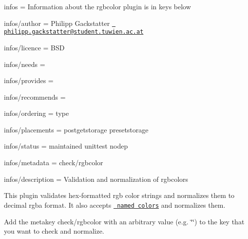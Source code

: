 
\begin{DoxyItemize}
\item infos = Information about the rgbcolor plugin is in keys below
\item infos/author = Philipp Gackstatter \href{mailto:philipp.gackstatter@student.tuwien.ac.at}{\texttt{ philipp.\+gackstatter@student.\+tuwien.\+ac.\+at}}
\item infos/licence = B\+SD
\item infos/needs =
\item infos/provides =
\item infos/recommends =
\item infos/ordering = type
\item infos/placements = postgetstorage presetstorage
\item infos/status = maintained unittest nodep
\item infos/metadata = check/rgbcolor
\item infos/description = Validation and normalization of rgbcolors
\end{DoxyItemize}

This plugin validates hex-\/formatted rgb color strings and normalizes them to decimal rgba format. It also accepts \href{https://www.w3.org/TR/css-color-3/\#svg-color}{\texttt{ named colors}} and normalizes them.

Add the metakey {\ttfamily check/rgbcolor} with an arbitrary value (e.\+g. {\ttfamily \char`\"{}\char`\"{}}) to the key that you want to check and normalize.


